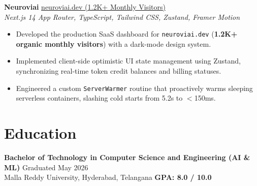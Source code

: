 \documentclass[10pt]{article}
\newcommand{\educationSection}{
\section*{Education}
\textbf{Bachelor of Technology in Computer Science and Engineering (AI \& ML)} \hfill Graduated May 2026 \\
Malla Reddy University, Hyderabad, Telangana \hfill \textbf{GPA: 8.0 / 10.0}
}
\begin{document}
\vspace{1.5pt}
\textbf{Neuroviai} \hfill \href{https://neuroviai.dev}{neuroviai.dev (1.2K+ Monthly Visitors)} \\
\textit{Next.js 14 App Router, TypeScript, Tailwind CSS, Zustand, Framer Motion}
\begin{itemize}
    \item Developed the production SaaS dashboard for \texttt{neuroviai.dev} (\textbf{1.2K+ organic monthly visitors}) with a dark-mode design system.
    \item Implemented client-side optimistic UI state management using Zustand, synchronizing real-time token credit balances and billing statuses.
    \item Engineered a custom \texttt{ServerWarmer} routine that proactively warms sleeping serverless containers, slashing cold starts from 5.2s to $<$150ms.
\end{itemize}

\educationSection
\end{document}
